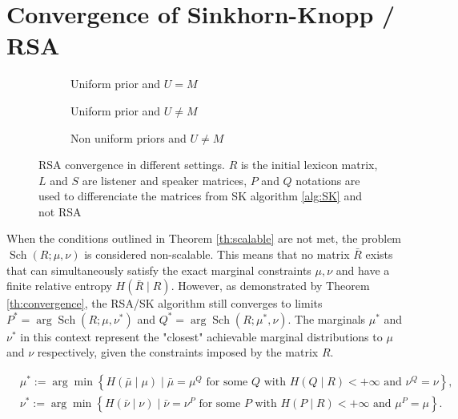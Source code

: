 \documentclass{article}
\begin{document}
\section{Convergence of Sinkhorn-Knopp / RSA}


\begin{figure}[h!]
    \centering
    \begin{subfigure}[t]{0.32\textwidth}
        \centering
        \scalebox{0.5}{}  %
        \caption{Uniform prior and $U=M$}
        \label{fig:subfig1}
    \end{subfigure}
    \hfill
    \begin{subfigure}[t]{0.32\textwidth}
        \centering
        \scalebox{0.5}{}  %
        \caption{Uniform prior and $U\neq M$}
        \label{fig:subfig2}
    \end{subfigure}
    \hfill
    \begin{subfigure}[t]{0.32\textwidth}
        \centering
        \scalebox{0.5}{}  %
        \caption{Non uniform priors and $U\neq M$}
        \label{fig:subfig3}
    \end{subfigure}
    \caption{RSA convergence in different settings. $R$ is the initial lexicon matrix, $L$ and $S$ are listener and speaker matrices, $P$ and $Q$ notations are used to differenciate the matrices from SK algorithm \ref{alg:SK} and not RSA}
    \label{fig:three-tikz}
\end{figure}

When the conditions outlined in Theorem \ref{th:scalable} are not met, the problem $\operatorname{Sch}(R ; \mu, \nu)$ is considered non-scalable. This means that no matrix $\bar{R}$ exists that can simultaneously satisfy the exact marginal constraints $\mu, \nu$ and have a finite relative entropy $H(\bar{R} \mid R)$. However, as demonstrated by Theorem \ref{th:convergence}, the RSA/SK algorithm still converges to limits $P^* = \arg \operatorname{Sch}(R ; \mu, \nu^*)$ and $Q^* = \arg \operatorname{Sch}(R ; \mu^*, \nu)$. The marginals $\mu^*$ and $\nu^*$ in this context represent the "closest" achievable marginal distributions to $\mu$ and $\nu$ respectively, given the constraints imposed by the matrix $R$.

\begin{equation}\label{eq:mu_nu}
\begin{aligned}
& \mu^*:=\arg \min \left\{H(\bar{\mu} \mid \mu) \mid \bar{\mu}=\mu^Q \text { for some } Q \text { with } H(Q \mid R)<+\infty \text { and } \nu^Q=\nu\right\}, \\
& \nu^*:=\arg \min \left\{H(\bar{\nu} \mid \nu) \mid \bar{\nu}=\nu^P \text { for some } P \text { with } H(P \mid R)<+\infty \text { and } \mu^P=\mu\right\} .
\end{aligned}
\end{equation}
\end{document}
